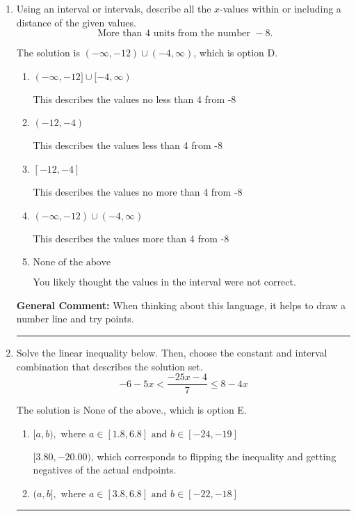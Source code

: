 \documentclass{extbook}[14pt]
\newcommand{\litem}[1]{\item #1

\rule{\textwidth}{0.4pt}}
\begin{document}
\begin{enumerate}
{\begin{enumerate}[label=\Alph*.]
Corresponds to inverting the inequality and negating the solution.
\item \( (-\infty, a) \cup (b, \infty), \text{ where } a \in [-2.2, -1.9] \text{ and } b \in [2.47, 4.04] \)

 * Correct option.
\item \( (-\infty, \infty) \)

Corresponds to the variable canceling, which does not happen in this instance.
\end{enumerate}

\textbf{General Comment:} When multiplying or dividing by a negative, flip the sign.
}
\litem{
Using an interval or intervals, describe all the $x$-values within or including a distance of the given values.
\[ \text{ More than } 4 \text{ units from the number } -8. \]

The solution is \( (-\infty, -12) \cup (-4, \infty) \), which is option D.\begin{enumerate}[label=\Alph*.]
\item \( (-\infty, -12] \cup [-4, \infty) \)

This describes the values no less than 4 from -8
\item \( (-12, -4) \)

This describes the values less than 4 from -8
\item \( [-12, -4] \)

This describes the values no more than 4 from -8
\item \( (-\infty, -12) \cup (-4, \infty) \)

This describes the values more than 4 from -8
\item \( \text{None of the above} \)

You likely thought the values in the interval were not correct.
\end{enumerate}

\textbf{General Comment:} When thinking about this language, it helps to draw a number line and try points.
}
\litem{
Solve the linear inequality below. Then, choose the constant and interval combination that describes the solution set.
\[ -6 - 5 x < \frac{-25 x - 4}{7} \leq 8 - 4 x \]

The solution is \( \text{None of the above.} \), which is option E.\begin{enumerate}[label=\Alph*.]
\item \( [a, b), \text{ where } a \in [1.8, 6.8] \text{ and } b \in [-24, -19] \)

$[3.80, -20.00)$, which corresponds to flipping the inequality and getting negatives of the actual endpoints.
\item \( (a, b], \text{ where } a \in [3.8, 6.8] \text{ and } b \in [-22, -18] \)


\end{enumerate}}
\end{enumerate}
\end{document}
